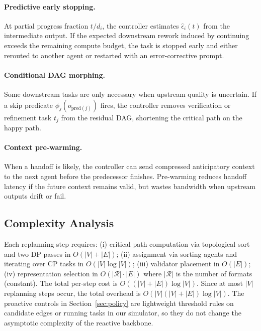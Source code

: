 \documentclass[10pt, twocolumn]{article}
\begin{document}
\paragraph{Predictive early stopping.}
At partial progress fraction $t/d_i$, the controller estimates $\hat{\epsilon}_i(t)$ from the intermediate output. If the expected downstream rework induced by continuing exceeds the remaining compute budget, the task is stopped early and either rerouted to another agent or restarted with an error-corrective prompt.

\paragraph{Conditional DAG morphing.}
Some downstream tasks are only necessary when upstream quality is uncertain. If a skip predicate $\phi_j(o_{\mathrm{pred}(j)})$ fires, the controller removes verification or refinement task $t_j$ from the residual DAG, shortening the critical path on the happy path.

\paragraph{Context pre-warming.}
When a handoff is likely, the controller can send compressed anticipatory context to the next agent before the predecessor finishes. Pre-warming reduces handoff latency if the future context remains valid, but wastes bandwidth when upstream outputs drift or fail.

\subsection{Complexity Analysis}

Each replanning step requires: (i) critical path computation via topological sort and two DP passes in $O(|V|+|E|)$; (ii) assignment via sorting agents and iterating over CP tasks in $O(|V| \log |V|)$; (iii) validator placement in $O(|E|)$; (iv) representation selection in $O(|\mathcal{R}| \cdot |E|)$ where $|\mathcal{R}|$ is the number of formats (constant). The total per-step cost is $O((|V|+|E|)\log|V|)$. Since at most $|V|$ replanning steps occur, the total overhead is $O(|V|(|V|+|E|)\log|V|)$. The proactive controls in Section~\ref{sec:policy} are lightweight threshold rules on candidate edges or running tasks in our simulator, so they do not change the asymptotic complexity of the reactive backbone.

\end{document}
